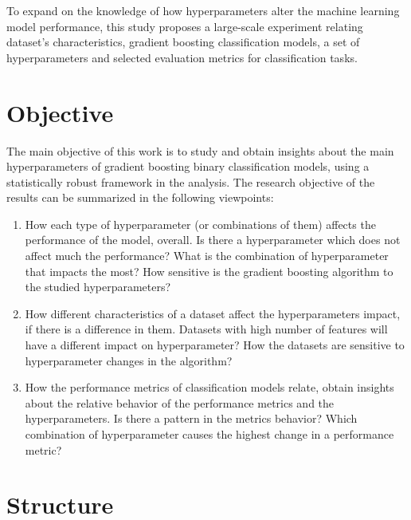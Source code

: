 To expand on the knowledge of how hyperparameters alter the machine learning model performance, this study proposes a large-scale experiment relating dataset's characteristics, gradient boosting classification models, a set of hyperparameters and selected evaluation metrics for classification tasks.

\section{Objective}
\label{sec:objetivo}

The main objective of this work is to study and obtain insights about the main hyperparameters of gradient boosting binary classification models, using a statistically robust framework in the analysis. The research objective of the results can be summarized in the following viewpoints:

\begin{enumerate}
  \item How each type of hyperparameter (or combinations of them) affects the performance of the model, overall. Is there a hyperparameter which does not affect much the performance? What is the combination of hyperparameter that impacts the most? How sensitive is the gradient boosting algorithm to the studied hyperparameters?
  \item How different characteristics of a dataset affect the hyperparameters impact, if there is a difference in them. Datasets with high number of features will have a different impact on hyperparameter? How the datasets are sensitive to hyperparameter changes in the algorithm?
  \item How the performance metrics of classification models relate, obtain insights about the relative behavior of the performance metrics and the hyperparameters. Is there a pattern in the metrics behavior? Which combination of hyperparameter causes the highest change in a performance metric?
\end{enumerate}


\section{Structure}
\label{sec:organizacao_trabalho}

